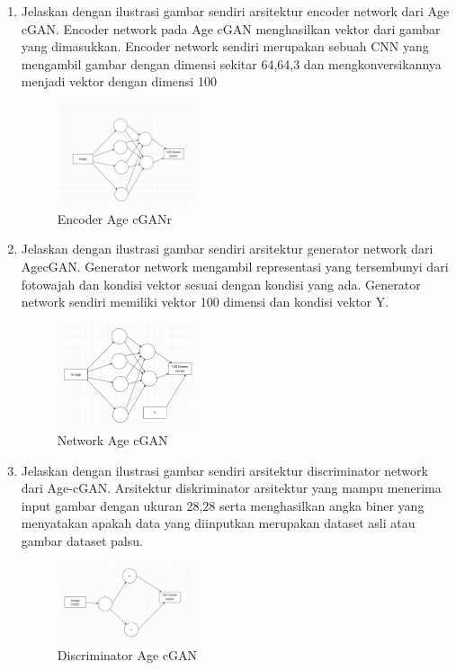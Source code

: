 \begin{enumerate}
        \item Jelaskan dengan ilustrasi gambar sendiri arsitektur encoder network dari Age cGAN.
			Encoder network pada Age cGAN menghasilkan vektor dari gambar yang dimasukkan. Encoder network sendiri merupakan sebuah CNN yang mengambil gambar dengan dimensi sekitar 64,64,3 dan mengkonversikannya menjadi vektor dengan dimensi 100
            \begin{figure}[H]
                \includegraphics[width=4cm]{figures/1174035/chapter9/teori3.png}
                    \centering
                \caption{Encoder Age cGANr}
            \end{figure}

        \item Jelaskan dengan ilustrasi gambar sendiri arsitektur generator network dari AgecGAN.
		Generator network mengambil representasi yang tersembunyi dari fotowajah dan kondisi vektor sesuai dengan kondisi yang ada. Generator network sendiri memiliki vektor 100 dimensi dan kondisi vektor Y. 
		\begin{figure}[H]
			\includegraphics[width=4cm]{figures/1174035/chapter9/teori4.png}
            	\centering
           	\caption{Network Age cGAN}
       	\end{figure}


        \item Jelaskan dengan ilustrasi gambar sendiri arsitektur discriminator network dari Age-cGAN.
		Arsitektur diskriminator arsitektur yang mampu menerima input gambar dengan ukuran 28,28 serta menghasilkan angka biner yang menyatakan apakah data yang diinputkan merupakan dataset asli atau gambar dataset palsu.
		\begin{figure}[H]
			\includegraphics[width=4cm]{figures/1174035/chapter9/teori5.png}
            	\centering
           	\caption{Discriminator Age cGAN}
       	\end{figure}



\end{enumerate}
